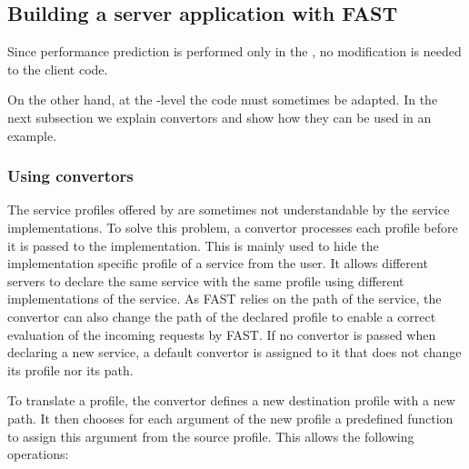 \subsection{Building a server application with FAST}

Since performance prediction is performed only in the \diet \sed,
no modification is needed to the client code.

On the other hand, at the \sed-level the code must sometimes be adapted.  In
the next subsection we explain convertors and show how they can be used
in an example.

\subsubsection{Using convertors}

The service profiles offered by \diet are sometimes not
understandable by the service implementations. To solve this problem,
a convertor processes each profile before it is passed to the
implementation. This is mainly used to
hide the implementation specific profile of a service from
the user. It allows different servers to declare the same
service with the same profile using different implementations
of the service. As FAST relies on the path of the service, the
convertor can also change the path of the declared profile to
enable a correct evaluation of the incoming requests by FAST.
If no convertor is passed when declaring a new service, a
default convertor is assigned to it that does not change its
profile nor its path.

To translate a profile, the convertor defines a new
destination profile with a new path. It then chooses for
each argument of the new profile a predefined function
to assign this argument from the source profile. This
allows the following operations:

